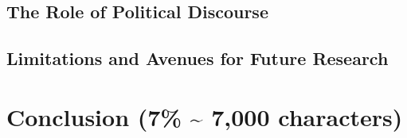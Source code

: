 \documentclass[12pt]{scrartcl}
\numberwithin{equation}{section}				%
\begin{document}
    \subsection{The Role of Political Discourse}
    
    \subsection{Limitations and Avenues for Future Research}
    
    \section{Conclusion (7\% \; \textasciitilde{} 7,000 characters)}
    
    \appendix
\end{document}
